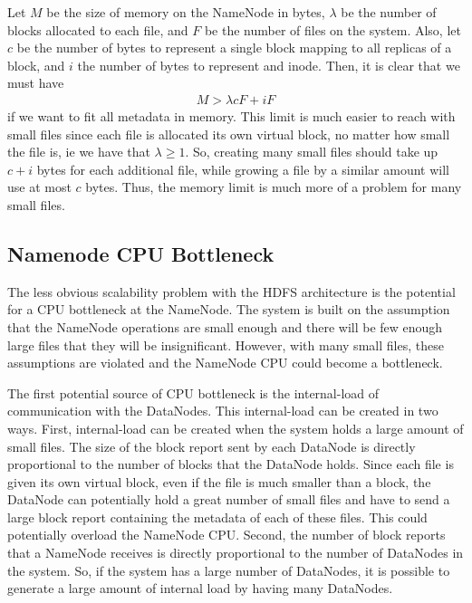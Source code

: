 \documentclass[11pt, a4paper]{article}
\begin{document}
\begin{multicols*}{2}
Let $ M $ be the size of memory on the NameNode in bytes, $ \lambda $ be the number of blocks allocated to each file, and $ F $ be the number of files on the system. Also, let $ c $ be the number of bytes to represent a single block mapping to all replicas of a block, and $ i $ the number of bytes to represent and inode. Then, it is clear that we must have 
\begin{align*}
	M > \lambda c F + i F
\end{align*}
	if we want to fit all metadata in memory. This limit is much easier to reach with small files since each file is allocated its own virtual block, no matter how small the file is, ie we have that $ \lambda \geq 1$. So, creating many small files should take up $ c + i$ bytes for each additional file, while growing a file by a similar amount will use at most $ c $ bytes. Thus, the memory limit is much more of a problem for many small files. 


\subsection{Namenode CPU Bottleneck}

The less obvious scalability problem with the HDFS architecture is the potential for a CPU bottleneck at the NameNode. The system is built on the assumption that the NameNode operations are small enough and there will be few enough large files that they will be insignificant. However, with many small files, these assumptions are violated and the NameNode CPU could become a bottleneck. 


The first potential source of CPU bottleneck is the internal-load of communication with the DataNodes. This internal-load can be created in two ways. First, internal-load can be created when the system holds a large amount of small files. The size of the block report sent by each DataNode is directly proportional to the number of blocks that the DataNode holds. Since each file is given its own virtual block, even if the file is much smaller than a block, the DataNode can potentially hold a great number of small files and have to send a large block report containing the metadata of each of these files. This could potentially overload the NameNode CPU. 
Second, the number of block reports that a NameNode receives is directly proportional to the number of DataNodes in the system. So, if the system has a large number of DataNodes, it is possible to generate a large amount of internal load by having many DataNodes.  



\end{multicols*}
\end{document}
